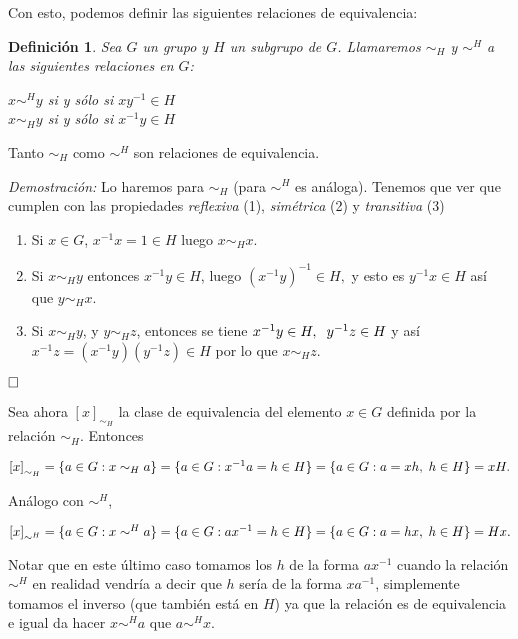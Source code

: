 \documentclass[12pt]{article}
\newtheorem{definition}[theorem]{Definición}
\begin{document}
Con esto, podemos definir las siguientes relaciones de equivalencia:

\begin{definition}Sea $G$ un grupo y $H$ un subgrupo de $G$. Llamaremos $\sim_{H}$ y $\sim^{H}$ a las siguientes \textit{relaciones} en $G$:
\begin{center}
$x\sim^{H}y$ si y sólo si $xy^{-1} \in H$\\
$x\sim_{H}y$ si y sólo si $x^{-1}y \in H$
\end{center}
\end{definition}

Tanto $\sim_{H}$ como  $\sim^{H}$ son relaciones de equivalencia.

\emph{Demostración: } Lo haremos para $\sim_{H}$ (para $\sim^{H}$ es análoga). Tenemos que ver que cumplen con las propiedades \textit{reflexiva} (1), \textit{simétrica} (2) y \textit{transitiva} (3)\begin{enumerate}
\item Si $x \in G$, $x^{-1}x = 1 \in H$ luego $x\sim_{H}x$.
\item Si $x\sim_{H}y$ entonces $x^{-1}y \in H$, luego $(x^{-1}y)^{-1} \in H,$ y esto es $y^{-1}x \in H$ así que $y\sim_{H}x$.
\item Si $x\sim_{H}y$, y $y\sim_{H}z$, entonces se tiene $x^{-1}y \in H, \hspace{0.2cm} y^{-1}z \in H$
y así $x^{-1}z = (x^{-1}y)(y^{-1}z) \in H$ por lo que $x\sim_{H}z$.
\end{enumerate}

$\hfill \square$

Sea ahora $\left[ x \right]_{\sim_{H}}$ la clase de equivalencia del elemento $x \in G$ definida por la relación $\sim_{H}$. Entonces \begin{center}$\left[ x \right]_{\sim_{H}} = \lbrace a \in G : x\sim_{H}a \rbrace = \lbrace a \in G : x^{-1}a = h \in H \rbrace = \lbrace a \in G: a = xh, \hspace{0.1cm} h \in H \rbrace = xH.$\end{center}

Análogo con $\sim^{H}$, \begin{center}$\left[ x \right]_{\sim^{H}} = \lbrace a \in G : x\sim^{H}a \rbrace = \lbrace a \in G: ax^{-1} = h \in H \rbrace = \lbrace a \in G : a = hx, \hspace{0.1cm} h \in H \rbrace = Hx.$\end{center} Notar que en este último caso tomamos los $h$ de la forma $ax^{-1}$ cuando la relación $\sim^{H}$ en realidad vendría a decir que $h$ sería de la forma $xa^{-1}$, simplemente tomamos el inverso (que también está en $H$) ya que la relación es de equivalencia e igual da hacer $x \sim^{H}a$ que $a\sim^{H}x$.
\end{document}
